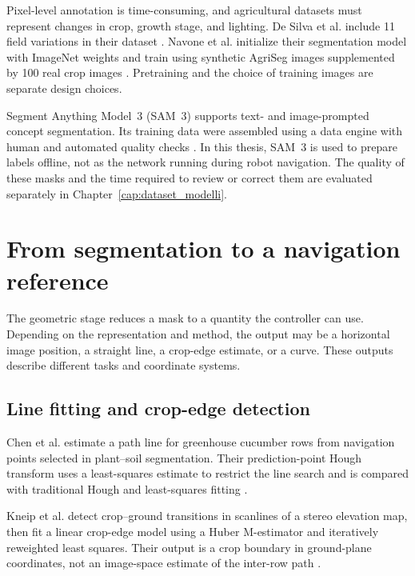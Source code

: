 Pixel-level annotation is time-consuming, and agricultural datasets
must represent changes in crop, growth stage, and lighting. De Silva et
al. include 11 field variations in their dataset
\cite[Section~3]{silva2023rowdetection}. Navone et al. initialize their
segmentation model with ImageNet weights and train using synthetic
AgriSeg images supplemented by 100 real crop images
\cite[Section~4.1, Table~1]{navone2025gpsfree}. Pretraining and the
choice of training images are separate design choices.

Segment Anything Model~3 (SAM~3) supports text- and image-prompted
concept segmentation. Its training data were assembled using a data
engine with human and automated quality checks
\cite[Sections~2 and~4]{carion2026sam3}. In this thesis, SAM~3 is used
to prepare labels offline, not as the network running during robot
navigation. The quality of these masks and the time required to review
or correct them are evaluated separately in Chapter~\ref{cap:dataset_modelli}.

\section{From segmentation to a navigation reference}
\label{sec:estrazione_traiettoria}

The geometric stage reduces a mask to a quantity the controller can use.
Depending on the representation and method, the output may be a
horizontal image position, a straight line, a crop-edge estimate, or a
curve. These outputs describe different tasks and coordinate systems.

\subsection{Line fitting and crop-edge detection}
\label{subsec:hough_fitting}

Chen et al. estimate a path line for greenhouse cucumber rows from
navigation points selected in plant--soil segmentation. Their
prediction-point Hough transform uses a least-squares estimate to
restrict the line search and is compared with traditional Hough and
least-squares fitting \cite[Sections~2--3]{chen2021navigation}.

Kneip et al. detect crop--ground transitions in scanlines of a stereo
elevation map, then fit a linear crop-edge model using a Huber
M-estimator and iteratively reweighted least squares. Their output is a
crop boundary in ground-plane coordinates, not an image-space estimate
of the inter-row path \cite[Sections~6--7]{kneip2020cropedge}.


